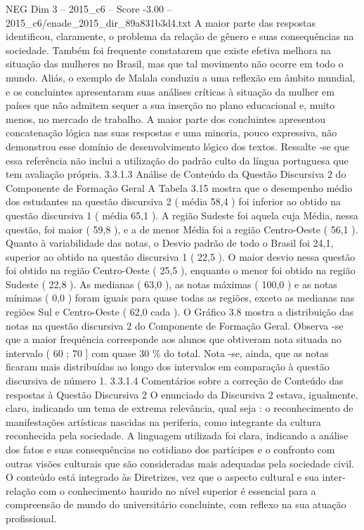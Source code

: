 \begin{textsample}{NEG Dim 3 – 2015\_c6 – Score -3.00 – 2015\_c6/enade\_2015\_dir\_89a831b3d4.txt}
A maior parte das respostas identificou, claramente, o problema da relação de gênero e suas consequências na sociedade.
Também foi frequente constatarem que existe efetiva melhora na situação das mulheres no Brasil, mas que tal movimento não ocorre em todo o mundo.
Aliás, o exemplo de Malala conduziu a uma reflexão em âmbito mundial, e os concluintes apresentaram suas análises críticas à situação da mulher em países que não admitem sequer a sua inserção no plano educacional e, muito menos, no mercado de trabalho.
A maior parte dos concluintes apresentou concatenação lógica nas suas respostas e uma minoria, pouco expressiva, não demonstrou esse domínio de desenvolvimento lógico dos textos.
Ressalte -se que essa referência não inclui a utilização do padrão culto da língua portuguesa que tem avaliação própria. 3.3.1.3 Análise de Conteúdo da Questão Discursiva 2 do Componente de Formação Geral A Tabela 3.15 mostra que o desempenho médio dos estudantes na questão discursiva 2 ( média 58,4 ) foi inferior ao obtido na questão discursiva 1 ( média 65,1 ).
A região Sudeste foi aquela cuja Média, nessa questão, foi maior ( 59,8 ), e a de menor Média foi a região Centro-Oeste ( 56,1 ).
Quanto à variabilidade das notas, o Desvio padrão de todo o Brasil foi 24,1, superior ao obtido na questão discursiva 1 ( 22,5 ).
O maior desvio nessa questão foi obtido na região Centro-Oeste ( 25,5 ), enquanto o menor foi obtido na região Sudeste ( 22,8 ).
As medianas ( 63,0 ), as notas máximas ( 100,0 ) e as notas mínimas ( 0,0 ) foram iguais para quase todas as regiões, exceto as medianas nas regiões Sul e Centro-Oeste ( 62,0 cada ).
O Gráfico 3.8 mostra a distribuição das notas na questão discursiva 2 do Componente de Formação Geral.
Observa -se que a maior frequência corresponde aos alunos que obtiveram nota situada no intervalo ( 60 ; 70 ] com quase 30 \% do total.
Nota -se, ainda, que as notas ficaram mais distribuídas ao longo dos intervalos em comparação à questão discursiva de número 1. 3.3.1.4 Comentários sobre a correção de Conteúdo das respostas à Questão Discursiva 2 O enunciado da Discursiva 2 estava, igualmente, claro, indicando um tema de extrema relevância, qual seja : o reconhecimento de manifestações artísticas nascidas na periferia, como integrante da cultura reconhecida pela sociedade.
A linguagem utilizada foi clara, indicando a análise dos fatos e suas consequências no cotidiano dos partícipes e o confronto com outras visões culturais que são consideradas mais adequadas pela sociedade civil.
O conteúdo está integrado às Diretrizes, vez que o aspecto cultural e sua inter-relação com o conhecimento haurido no nível superior é essencial para a compreensão de mundo do universitário concluinte, com reflexo na sua atuação profissional.

\end{textsample}
